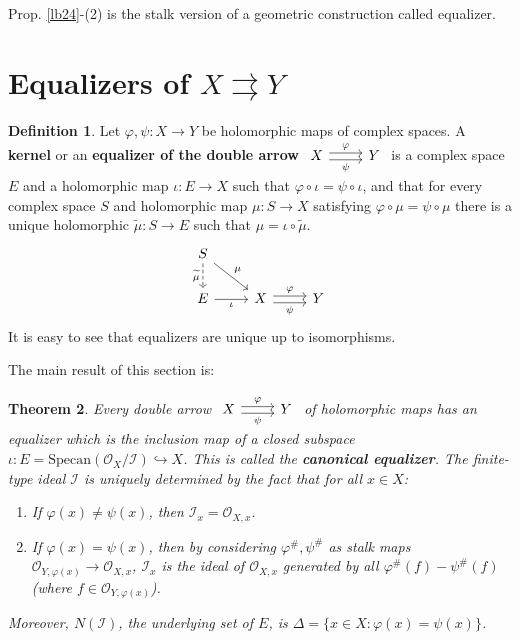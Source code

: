 \documentclass[12pt,b5paper,notitlepage]{report}
\theoremstyle{definition}
\newtheorem{df}{Definition}[section]
\theoremstyle{plain}
\newtheorem{thm}[df]{Theorem}
\newcommand{\mc}{\mathcal}
\newcommand{\wtd}{\widetilde}
\newcommand{\scr}{\mathscr}
\newcommand{\Specan}{\mathrm{Specan}}
\numberwithin{equation}{section}
\begin{document}
Prop. \ref{lb24}-(2) is the stalk version of a geometric construction called equalizer.


\section{Equalizers of $X\rightrightarrows Y$}

\begin{df}\label{lb139}
Let $\varphi,\psi:X\rightarrow Y$ be holomorphic maps of complex spaces. A  \textbf{kernel} or an \textbf{equalizer of the double arrow} $\begin{tikzcd}
X \arrow[r,shift left, "\varphi"] \arrow[r,shift right,"\psi"'] & Y
\end{tikzcd}$
is a complex space $E$ and a holomorphic map $\iota:E\rightarrow X$ such that $\varphi\circ\iota=\psi\circ\iota$, and that for every complex space $S$ and holomorphic map $\mu:S\rightarrow X$ satisfying $\varphi\circ\mu=\psi\circ\mu$ there is a unique holomorphic $\wtd\mu:S\rightarrow E$ such that $\mu=\iota\circ\wtd\mu$.
\begin{equation}\label{eq17}
\begin{tikzcd}
S \arrow[rd, "\mu"] \arrow[d, "{\wtd\mu}"', dashed] &                                                           &   \\
E \arrow[r, "\iota"']                   & X \arrow[r, "\psi"', shift right] \arrow[r, "\varphi", shift left] & Y
\end{tikzcd}
\end{equation}
It is easy to see that equalizers are unique up to isomorphisms.
\end{df}

The main result of this section is:

\begin{thm}\label{lb26}
Every double arrow $\begin{tikzcd}
X \arrow[r,shift left, "\varphi"] \arrow[r,shift right,"\psi"'] & Y
\end{tikzcd}$ of holomorphic maps has an equalizer which is the inclusion map of a closed subspace $\iota:E=\Specan(\scr O_X/\mc I)\hookrightarrow X$. This is called the \textbf{canonical equalizer}.  The finite-type ideal $\mc I$ is uniquely determined by the fact that for all $x\in X$:
\begin{enumerate}[label=(\alph*)]
\item If $\varphi(x)\neq\psi(x)$, then $\mc I_x=\scr O_{X,x}$.
\item If $\varphi(x)=\psi(x)$, then by considering $\varphi^\#,\psi^\#$ as stalk maps $\scr O_{Y,\varphi(x)}\rightarrow\scr O_{X,x}$, $\mc I_x$ is the ideal of $\scr O_{X,x}$ generated by all $\varphi^\#(f)-\psi^\#(f)$ (where $f\in\scr O_{Y,\varphi(x)}$).
\end{enumerate}
Moreover, $N(\mc I)$, the underlying set of $E$, is $\Delta=\{x\in X:\varphi(x)=\psi(x)\}$.
\end{thm}
\end{document}
